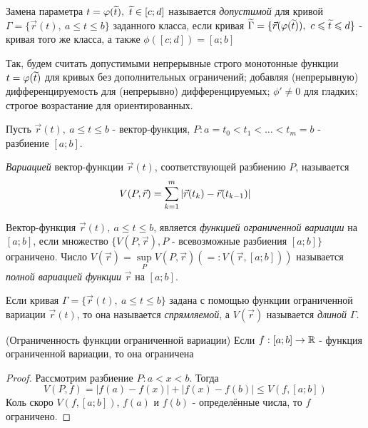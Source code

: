 \begin{definition}
	Замена параметра $t = \varphi(\widetilde{t}),\ \widetilde{t} \in [c; d]$ называется \textit{допустимой} для кривой $\Gamma = \{\vec{r}(t),\ a \le t \le b\}$ заданного класса, если кривая $\widetilde{\Gamma} = \{\vec{r}(\varphi(\widetilde{t})),\ c \leqslant \widetilde{t} \leqslant d\}$ - кривая того же класса, а также $\phi([c; d]) = [a; b]$
	
	Так, будем считать допустимыми непрерывные строго монотонные функции $t = \varphi(\widetilde{t})$ для кривых без дополнительных ограничений; добавляя (непрерывную) дифференцируемость для (непрерывно) дифференцируемых; $\phi' \neq 0$ для гладких; строгое возрастание для ориентированных.
\end{definition}

\begin{definition}
	Пусть $\vec{r}(t),\ a \le t \le b$ - вектор-функция, $P: a = t_0 < t_1 < \ldots < t_m = b$ - разбиение $[a; b]$.
	
	\textit{Вариацией} вектор-функции $\vec{r}(t)$, соответствующей разбиению $P$, называется 
	\[
		V(P, \vec{r}) = \sum\limits_{k = 1}^m |\vec{r}(t_k) - \vec{r}(t_{k - 1})|
	\]
\end{definition}

\begin{definition}
	Вектор-функция $\vec{r}(t),\ a \le t \le b$, является \textit{функцией ограниченной вариации} на $[a; b]$, если множество $\{V(P, \vec{r}), P \text{ - всевозможные разбиения }[a; b]\}$ ограничено. Число $V(\vec{r}) = \sup\limits_{P} V(P, \vec{r})\left(=: V(\vec{r}, [a; b])\right)$ называется \textit{полной вариацией функции} $\vec{r}$ на $[a; b]$.
\end{definition}

\begin{definition}
	Если кривая $\Gamma = \{\vec{r}(t),\ a \le t \le b\}$ задана с помощью функции ограниченной вариации $\vec{r}(t)$, то она называется \textit{спрямляемой}, а $V(\vec{r})$ называется \textit{длиной} $\Gamma$.
\end{definition}


\begin{theorem} (Ограниченность функции ограниченной вариации)
	Если $f: [a; b] \to \mathbb{R}$ - функция ограниченной вариации, то она ограничена
\end{theorem}

\begin{proof}
	Рассмотрим разбиение $P: a < x < b$. Тогда
	\[
		V(P, f) = |f(a) - f(x)| + |f(x) - f(b)| \le V(f, [a; b])
	\]
	Коль скоро $V(f, [a; b])$, $f(a)$ и $f(b)$ - определённые числа, то $f$ ограничено.
\end{proof}

